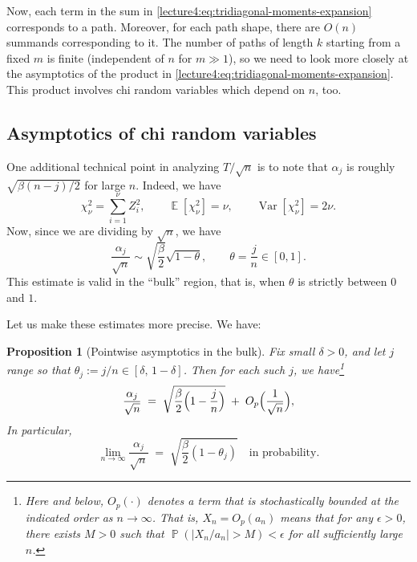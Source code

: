 \documentclass[letterpaper,11pt,oneside,reqno]{book}
\numberwithin{equation}{chapter}  %
\newtheorem{proposition}{Proposition}[chapter]  %
\theoremstyle{definition}
\begin{document}
Now, each term in the sum in \eqref{lecture4:eq:tridiagonal-moments-expansion}
corresponds to a path. Moreover, for each path shape,
there are $O(n)$ summands corresponding to it. The number of
paths of length $k$ starting from a fixed $m$
is finite (independent of $n$ for $m\gg 1$),
so we need to look more closely at the asymptotics of the product
in \eqref{lecture4:eq:tridiagonal-moments-expansion}. This product
involves chi random variables which depend on $n$, too.

\subsection{Asymptotics of chi random variables}
\label{lecture4:sub:chi-asymptotics}

One additional technical point in analyzing $T/\sqrt{n}$ is to note that $\alpha_j$
is roughly $\sqrt{\beta(n-j)/2}$ for large $n$.
Indeed, we have
\begin{equation*}
	\chi^2_\nu=\sum_{i=1}^\nu Z_i^2,\qquad
	\operatorname{\mathbb{E}}[\chi^2_\nu]=\nu,\qquad
	\operatorname{Var}[\chi^2_\nu]=2\nu.
\end{equation*}
Now, since we are dividing by $\sqrt n$, we have
\begin{equation*}
	\frac{\alpha_j}{\sqrt n}\sim \sqrt{\frac{\beta}{2}}\sqrt{1-\theta},\qquad
	\theta=\frac{j}{n}\in [0,1].
\end{equation*}
This estimate is valid in the ``bulk'' region, that is, when $\theta$ is strictly between $0$ and $1$.

Let us make these estimates more precise.  We have:
\begin{proposition}[Pointwise asymptotics in the bulk]
\label{lecture4:prop:alpha-bulk}
Fix small $\delta>0$, and let $j$ range so that $\theta_j := j/n \in [\delta,\, 1-\delta]$.
Then for each such $j$, we have\footnote{Here and below, $O_p(\cdot)$ denotes a term that is stochastically bounded at the indicated order as $n\to\infty$. That is, $X_n = O_p(a_n)$ means that for any $\epsilon>0$, there exists $M>0$ such that $\operatorname{\mathbb{P}}(|X_n/a_n| > M) < \epsilon$ for all sufficiently large $n$.}
\[
  \frac{\alpha_j}{\sqrt{n}}
	\;=\; \sqrt{\frac{\beta}{2}\Bigl(1 - \frac{j}{n}\Bigr)}
  \;+\; O_p\Bigl(\frac{1}{\sqrt{n}}\Bigr),
\]
In particular,
\[
  \lim_{n\to\infty} \frac{\alpha_j}{\sqrt{n}}
	\;=\; \sqrt{\frac{\beta}{2}(1-\theta_j)}
  \quad\text{in probability.}
\]
\end{proposition}
\end{document}
